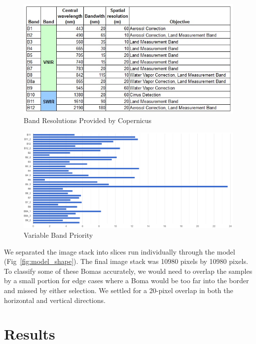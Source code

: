 \documentclass[10pt]{article}
\begin{document}
\begin{figure} [H]
    \centering
    \includegraphics[width=1\linewidth]{images/copernicus_band_resolution.png}
    \caption{Band Resolutions Provided by Copernicus}
    \label{fig:cop_bands_chart}
\end{figure}

\begin{figure} [H]
    \centering
    \includegraphics[width=1\linewidth]{images/bands importance.png}
    \caption{Variable Band Priority}
    \label{fig:band_importance}
\end{figure}

We separated the image stack into slices run individually through the model (Fig~\ref{fig:model_shape}). The final image stack was 10980 pixels by 10980 pixels. To classify some of these Bomas accurately, we would need to overlap the samples by a small portion for edge cases where a Boma would be too far into the border and missed by either selection. We settled for a 20-pixel overlap in both the horizontal and vertical directions.

\section{Results}
\end{document}
